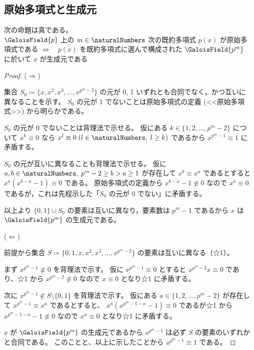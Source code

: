         \subsection{原始多項式と生成元}
            \begin{shadebox}
                次の命題は真である。\\
                $\GaloisField{p}$ 上の $m\in\naturalNumbers$ 次の既約多項式 $p(x)$ が原始多項式である $\iff\quad p(x)$ を既約多項式に選んで構成された $\GaloisField{p^m}$ に於いて $x$ が生成元である
            \end{shadebox}
            \begin{proof}
                \quad\par\noindent
                ($\Rightarrow$)
                \par
                集合 $S_0\coloneq\{x,x^2,x^3,\dots,x^{p^m-2}\}$ の元が 0, 1 いずれとも合同でなく，かつ互いに異なることを示す。
                $S_0$ の元が 1 でないことは原始多項式の定義 (<<原始多項式>>) から明らかである。
                \par
                $S_0$ の元が 0 でないことは背理法で示せる。
                仮にある $k\in\{1,2,\dots,p^m-2\}$ について $x^k\equiv 0$ なら $x^l\equiv 0\;(l\in\naturalNumbers,\;l\geq k)$ であるから $x^{p^m-1}\equiv 1$ に矛盾する。
                \par
                $S_0$ の元が互いに異なることも背理法で示せる。
                仮に $a,b\in\naturalNumbers,\;p^m-2\geq b>a\geq1$ が存在して $x^b\equiv x^a$ であるとすると $x^a(x^{b-a}-1)\equiv 0$ である。
                原始多項式の定義から $x^{b-a}-1\not\equiv 0$ なので $x^a\equiv 0$ であるが，これは先程示した「$S_0$ の元が 0 でない」に矛盾する。
                \par
                以上より $\{0,1\}\cup S_0$ の要素は互いに異なり，要素数は $p^m-1$ であるから $x$ は $\GaloisField{p^m}$ の生成元である。
                \par\noindent
                ($\Leftarrow$)
                \par
                前提から集合 $S\coloneq\{0,1,x,x^2,x^3,\dots,x^{p^m-2}\}$ の要素は互いに異なる（☆1）。
                \par
                まず $x^{p^m-1}\not\equiv 0$ を背理法で示す。
                仮に $x^{p^m-1}\equiv 0$ とすると $x^{p^m-2}x\equiv 0$ であり、☆1 から $x^{p^m-2}\not\equiv 0$ なので $x\equiv 0$ となり☆1 に矛盾する。
                \par
                次に $x^{p^m-1}\not\in S\setminus\{0,1\}$ を背理法で示す。
                仮にある $a\in\{1,2,\dots,p^m-2\}$ が存在して $x^{p^m-1}\equiv x^a$ であるとすると、 $x^a(x^{p^m-1-a}-1)\equiv 0$ であるが☆1 から $x^{p^m-1-a}-1\not\equiv 0$ なので $x^a\equiv 0$ となり☆1 に矛盾する。
                \par
                $x$ が $\GaloisField{p^m}$ の生成元であるから $x^{p^m-1}$ は必ず $S$ の要素のいずれかと合同である。
                このことと、以上に示したことから $x^{p^m-1}\equiv 1$ である。
            \end{proof}
